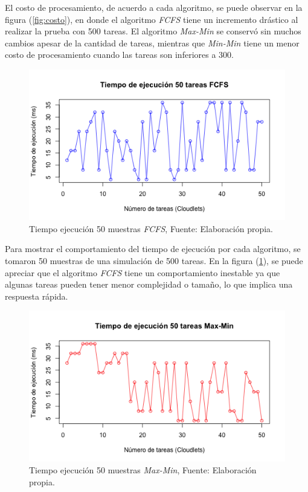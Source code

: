 El costo de procesamiento, de acuerdo a cada algoritmo, se puede observar en la figura (\ref{fig:costo}), en donde el algoritmo \textit{FCFS} tiene un incremento dr\'astico al realizar la prueba con 500 tareas. El algoritmo \textit{Max-Min} se conserv\'o sin muchos cambios apesar de la cantidad de tareas, mientras que \textit{Min-Min} tiene un menor costo de procesamiento cuando las tareas son inferiores a 300.
\label{etiqueta2}
\newpage

\renewcommand\thefigure{\arabic{figure}}
\begin{figure}[h!] 
	\centering
	\includegraphics[scale=0.6]{media/fcfs}
	\caption{Tiempo ejecuci\'on 50 muestras \textit{FCFS}, Fuente: Elaboraci\'on propia.}
	\label{fig:ejecucion}
\end{figure}


Para mostrar el comportamiento del tiempo de ejecuci\'on por cada algoritmo, se tomaron 50 muestras de una simulaci\'on de 500 tareas. En la figura (\ref{fig:ejecucion}), se puede apreciar que el algoritmo \textit{FCFS} tiene un comportamiento inestable ya que algunas tareas pueden tener menor complejidad o tamaño, lo que implica una respuesta r\'apida.

\newpage

\renewcommand\thefigure{\arabic{figure}}
\begin{figure}[h!] 
	\centering
	\includegraphics[scale=0.6]{media/maxmin}
	\caption{Tiempo ejecuci\'on 50 muestras \textit{Max-Min}, Fuente: Elaboraci\'on propia.}
	\label{fig:maxmin}
\end{figure}


